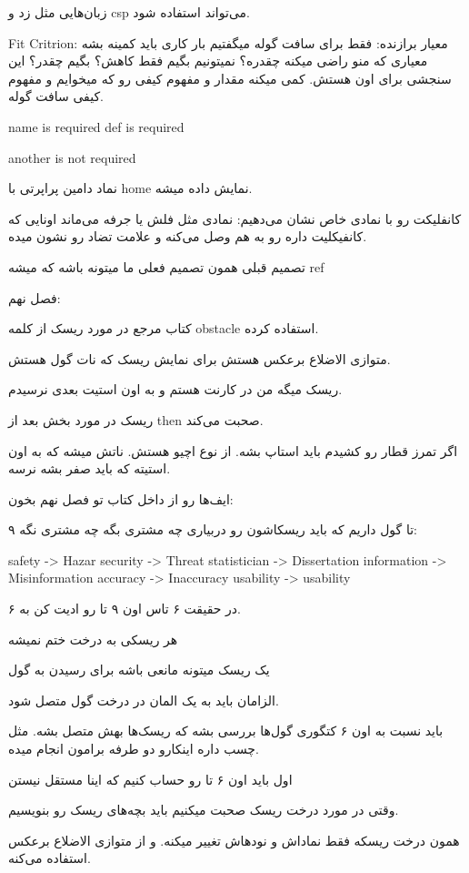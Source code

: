 زبان‌هایی مثل زد و csp می‌تواند استفاده شود.

Fit Critrion: معیار برازنده: فقط برای سافت گوله
میگفتیم بار کاری باید کمینه بشه معیاری که منو راضی میکنه چقدره؟ نمیتونیم بگیم
فقط کاهش؟ بگیم چقدر؟ این سنجشی برای اون هستش. کمی میکنه مقدار و مفهوم کیفی رو
که
میخوایم و مفهوم کیفی سافت گوله.

name is required
def is required

another is not required

نماد دامین پراپرتی با home نمایش داده میشه.

کانفلیکت رو با نمادی خاص نشان می‌دهیم: نمادی مثل فلش یا جرفه می‌ماند اونایی که
کانفیکلیت داره رو به هم وصل می‌کنه و علامت تضاد رو نشون میده.

تصمیم قبلی همون تصمیم فعلی ما میتونه باشه که میشه ref

فصل نهم:

کتاب مرجع در مورد ریسک از کلمه obstacle استفاده کرده.

متوازی الاضلاع برعکس هستش برای نمایش ریسک که نات گول هستش.

ریسک میگه من در کارنت هستم و به اون استیت بعدی نرسیدم.

ریسک در مورد بخش بعد از then صحبت می‌کند.

اگر تمرز قطار رو کشیدم باید استاپ بشه. از نوع اچیو هستش. ناتش میشه که به اون
استیته که باید صفر بشه نرسه.

ایف‌ها رو از داخل کتاب تو فصل نهم بخون:

۹ تا گول داریم که باید ریسکاشون رو دربیاری چه مشتری بگه چه مشتری نگه:

safety -> Hazar
security -> Threat
statistician -> Dissertation
information -> Misinformation
accuracy -> Inaccuracy
usability -> usability

در حقیقت ۶ تاس اون ۹ تا رو ادیت کن به ۶.

هر ریسکی به درخت ختم نمیشه

یک ریسک میتونه مانعی باشه برای رسیدن به گول

الزامان باید به یک المان در درخت گول متصل شود.

باید نسبت به اون ۶ کتگوری گول‌ها بررسی بشه که ریسک‌ها بهش متصل بشه.
مثل چسب داره اینکارو دو طرفه برامون انجام میده.

اول باید اون ۶ تا رو حساب کنیم که اینا مستقل نیستن

وقتی در مورد درخت ریسک صحبت میکنیم باید بچه‌های ریسک رو بنویسیم.

همون درخت ریسکه فقط نماداش و نود‌هاش تغییر میکنه. و از متوازی الاضلاع برعکس
استفاده می‌کنه.

